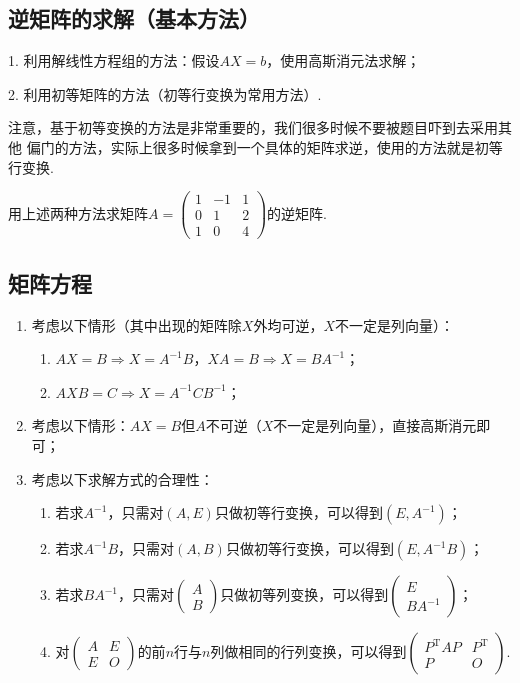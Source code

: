 \subsection{逆矩阵的求解（基本方法）}
1. 利用解线性方程组的方法：假设$AX=b$，使用高斯消元法求解；

2. 利用初等矩阵的方法（初等行变换为常用方法）.

注意，基于初等变换的方法是非常重要的，我们很多时候不要被题目吓到去采用其他
偏门的方法，实际上很多时候拿到一个具体的矩阵求逆，使用的方法就是初等行变换.

\begin{example}
	用上述两种方法求矩阵$A=\begin{pmatrix}1 & -1 & 1 \\ 0 & 1 & 2 \\ 1 & 0 & 4\end{pmatrix}$的逆矩阵.
\end{example}

\subsection{矩阵方程}
\begin{enumerate}
	\item 考虑以下情形（其中出现的矩阵除$X$外均可逆，$X$不一定是列向量）：
	\begin{enumerate}
		\item $AX=B \Rightarrow X=A^{-1}B$，$XA=B \Rightarrow X=BA^{-1}$；
		\item $AXB=C \Rightarrow X=A^{-1}CB^{-1}$；
	\end{enumerate}
	\item 考虑以下情形：$AX=B$但$A$不可逆（$X$不一定是列向量），直接高斯消元即可；
	\item 考虑以下求解方式的合理性：
	\begin{enumerate}
		\item 若求$A^{-1}$，只需对$(A,E)$只做初等行变换，可以得到$(E,A^{-1})$；
		\item 若求$A^{-1}B$，只需对$(A,B)$只做初等行变换，可以得到$(E,A^{-1}B)$；
		\item 若求$BA^{-1}$，只需对$\begin{pmatrix}
			A \\ B
		\end{pmatrix}$只做初等列变换，可以得到$\begin{pmatrix}
			E \\ BA^{-1}
		\end{pmatrix}$；
		\item 对$\begin{pmatrix}
			A & E \\ E & O
		\end{pmatrix}$的前$n$行与$n$列做相同的行列变换，可以得到$\begin{pmatrix}
			P^\mathrm{T}AP & P^\mathrm{T} \\ P & O
		\end{pmatrix}$.
	\end{enumerate}
\end{enumerate}

